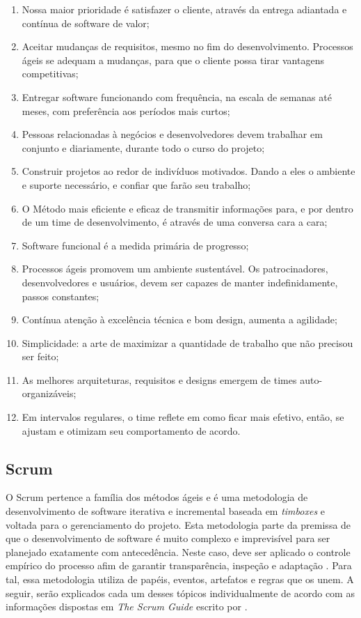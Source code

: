 \begin{enumerate}
    \item Nossa maior prioridade é satisfazer o cliente, através da entrega adiantada
    e contínua de software de valor;
    \item Aceitar mudanças de requisitos, mesmo no fim do desenvolvimento. Processos
    ágeis se adequam a mudanças, para que o cliente possa tirar vantagens competitivas;
    \item Entregar software funcionando com frequência, na escala de semanas até meses,
    com preferência aos períodos mais curtos;
    \item Pessoas relacionadas à negócios e desenvolvedores devem trabalhar em conjunto
    e diariamente, durante todo o curso do projeto;
    \item Construir projetos ao redor de indivíduos motivados. Dando a eles o ambiente e
    suporte necessário, e confiar que farão seu trabalho;
    \item O Método mais eficiente e eficaz de transmitir informações para, e por dentro
    de um time de desenvolvimento, é através de uma conversa cara a cara;
    \item Software funcional é a medida primária de progresso;
    \item Processos ágeis promovem um ambiente sustentável. Os patrocinadores,
    desenvolvedores e usuários, devem ser capazes de manter indefinidamente, passos
    constantes;
    \item Contínua atenção à excelência técnica e bom design, aumenta a agilidade;
    \item Simplicidade: a arte de maximizar a quantidade de trabalho que não precisou ser
    feito;
    \item As melhores arquiteturas, requisitos e designs emergem de times auto-organizáveis;
    \item Em intervalos regulares, o time reflete em como ficar mais efetivo, então, se
    ajustam e otimizam seu comportamento de acordo.
\end{enumerate}

\subsection{Scrum}

O Scrum pertence a família dos métodos ágeis e é uma metodologia de desenvolvimento
de software iterativa e incremental baseada em \textit{timboxes} e voltada para o
gerenciamento do projeto. Esta metodologia parte da premissa de que o desenvolvimento
de software é muito complexo e imprevisível para ser planejado exatamente com
antecedência. Neste caso, deve ser aplicado o controle empírico do processo afim de
garantir transparência, inspeção e adaptação \cite{Mahnic2005}. Para tal, essa
metodologia utiliza de papéis, eventos, artefatos e regras que os unem. A seguir,
serão explicados cada um desses tópicos individualmente de acordo com as informações
dispostas em \textit{The Scrum Guide} escrito por .

